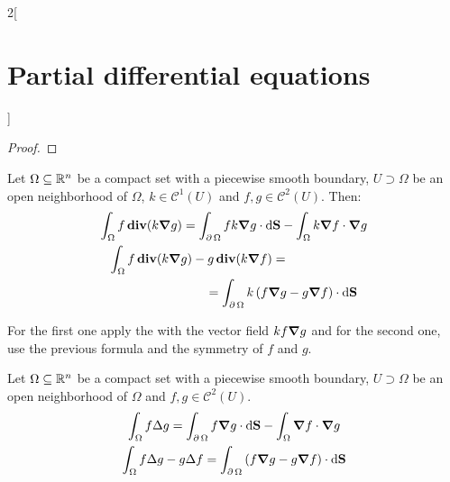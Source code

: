 \documentclass[../../../main_math.tex]{subfiles}
\begin{document}
\begin{multicols}{2}[\section{Partial differential equations}]
\begin{proof}
  \end{proof}
  \begin{proposition}
    Let $\Omega\subseteq\mathbb{R}^n$ be a compact set with a piecewise smooth boundary, $U\supset \Omega$ be an open neighborhood of $\Omega$, $k\in\mathcal{C}^1(U)$ and $f,g\in\mathcal{C}^2(U)$. Then:
    \begin{gather*}
      \int_\Omega f\operatorname{\boldsymbol{\mathrm{div}}}(k\grad{g})                                =\int_{\operatorname{\partial}{\Omega}}fk\grad{g}\cdot\dd{\boldsymbol{\mathrm{S}}} -\int_\Omega k\grad{f}\cdot\grad{g} \\
      \begin{split}
        \int_\Omega f\operatorname{\boldsymbol{\mathrm{div}}}(k\grad{g})-g\operatorname{\boldsymbol{\mathrm{div}}}(k\grad{f})= \hspace{2cm}\\\hspace{2cm}=\int_{\operatorname{\partial}{\Omega}} k\left(f\grad{g}-g\grad{f}\right)\cdot\dd{\boldsymbol{\mathrm{S}}}
      \end{split}
    \end{gather*}
  \end{proposition}
  \begin{sproof}
    For the first one apply the  with the vector field $kf\grad{g}$ and for the second one, use the previous formula and the symmetry of $f$ and $g$.
  \end{sproof}
  \begin{corollary}\label{PDE:greenidentities}
    Let $\Omega\subseteq\mathbb{R}^n$ be a compact set with a piecewise smooth boundary, $U\supset \Omega$ be an open neighborhood of $\Omega$ and $f,g\in\mathcal{C}^2(U)$.
    \begin{gather*}
      \int_\Omega f\Delta{g}                              =\int_{\operatorname{\partial}{\Omega}}f\grad{g}\cdot\dd{\boldsymbol{\mathrm{S}}} -\int_\Omega \grad{f}\cdot\grad{g} \\
      \int_\Omega f\Delta{g}-g\Delta{f}  =\int_{\operatorname{\partial}{\Omega}} \left(f\grad{g}-g\grad{f}\right)\cdot\dd{\boldsymbol{\mathrm{S}}}
    \end{gather*}
  \end{corollary}

\end{multicols}
\end{document}
